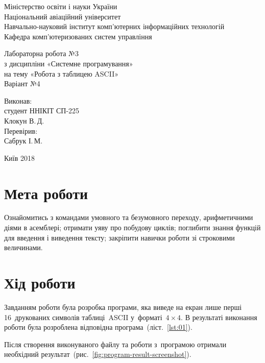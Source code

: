 \documentclass[a4paper,oneside,DIV=12,12pt,headings=normal]{scrartcl}
\begin{document}
	\begin{titlepage}
	\centering
		Міністерство освіти і науки України\\
		Національний авіаційний університет\\
		Навчально-науковий інститут комп'ютерних інформаційних технологій\\
		Кафедра комп'ютеризованих систем управління

		\vspace*{\fill}

		Лабораторна робота №3\\
		з дисципліни «Системне програмування»\\
		на тему «Робота з таблицею ASCII»\\
		Варіант №4

		\vspace*{\fill}
		
		\begin{flushright}
			Виконав:\\
			студент ННІКІТ СП-225\\
			Клокун В.\,Д.\\
			Перевірив:\\
			Сабрук І.\,М.
		\end{flushright}

		Київ 2018
    \end{titlepage}
	
	\section{Мета роботи}
		Ознайомитись з командами умовного та безумовного переходу, арифметичними діями в асемблері; отримати уяву про побудову циклів; поглибити знання функцій для введення і виведення тексту; закріпити навички роботи зі строковими величинами.
		
	\section{Хід роботи}
		Завданням роботи була розробка програми, яка виведе на екран лише перші 16~друкованих символів таблиці~ASCII у~форматі~$4 \times 4$. В результаті виконання роботи була розроблена відповідна програма~(ліст.~\ref{lst:01}).
		
		Після створення виконуваного файлу та роботи з~програмою отримали необхідний результат~(рис.~\ref{fig:program-result-screenshot}).
		
\end{document}
